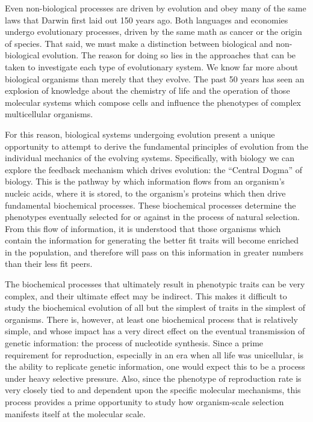 Even non-biological processes are driven by evolution and obey many of the same laws that Darwin first laid out 150 years ago. Both languages and economies undergo evolutionary processes, driven by the same math as cancer or the origin of species\cite{ANowak:2006p857}. That said, we must make a distinction between biological and non-biological evolution. The reason for doing so lies in the approaches that can be taken to investigate each type of evolutionary system. We know far more about biological organisms than merely that they evolve. The past 50 years has seen an explosion of knowledge about the chemistry of life and the operation of those molecular systems which compose cells and influence the phenotypes of complex multicellular organisms.

For this reason, biological systems undergoing evolution present a unique opportunity to attempt to derive the fundamental principles of evolution from the individual mechanics of the evolving systems. Specifically, with biology we can explore the feedback mechanism which drives evolution: the ``Central Dogma'' of biology. This is the pathway by which information flows from an organism's nucleic acids, where it is stored, to the organism's proteins which then drive fundamental biochemical processes\cite{Thieffry:1998p913}. These biochemical processes determine the phenotypes eventually selected for or against in the process of natural selection. From this flow of information, it is understood that those organisms which contain the information for generating the better fit traits will become enriched in the population, and therefore will pass on this information in greater numbers than their less fit peers\cite{Darwin:1883p935}.

The biochemical processes that ultimately result in phenotypic traits can be very complex, and their ultimate effect may be indirect. This makes it difficult to study the biochemical evolution of all but the simplest of traits in the simplest of organisms. There is, however, at least one biochemical process that is relatively simple, and whose impact has a very direct effect on the eventual transmission of genetic information: the process of nucleotide synthesis. Since a prime requirement for reproduction, especially in an era when all life was unicellular, is the ability to replicate genetic information, one would expect this to be a process under heavy selective pressure. Also, since the phenotype of reproduction rate is very closely tied to and dependent upon the specific molecular mechanisms, this process provides a prime opportunity to study how organism-scale selection manifests itself at the molecular scale.

